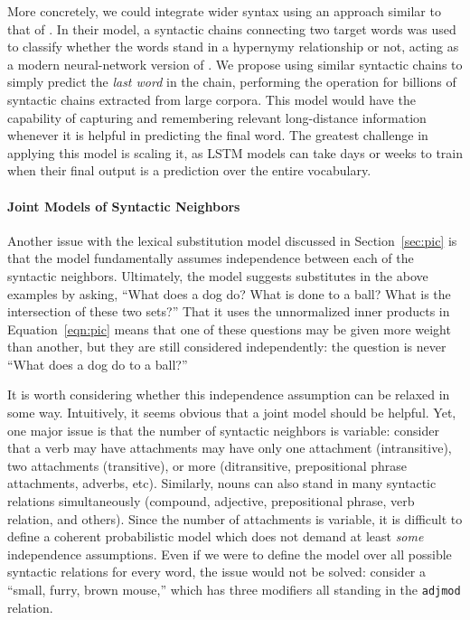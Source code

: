 \documentclass[12pt]{article}
\begin{document}
More concretely, we could integrate wider syntax using an approach similar to
that of . In their model, a syntactic chains
connecting two target words was used to classify whether the words stand in a
hypernymy relationship or not, acting as a modern neural-network version of
. We propose using similar syntactic chains to simply
predict the {\em last word} in the chain, performing the operation for billions
of syntactic chains extracted from large corpora. This model would have the
capability of capturing and remembering relevant long-distance information
whenever it is helpful in predicting the final word. The greatest challenge
in applying this model is scaling it, as LSTM models can take days or weeks
to train when their final output is a prediction over the entire vocabulary.

\paragraph{Joint Models of Syntactic Neighbors}

Another issue with the lexical substitution model discussed in Section~\ref{sec:pic}
is that the model fundamentally assumes independence between each of the syntactic
neighbors. Ultimately, the model suggests substitutes in the above examples by
asking, ``What does a dog do? What is done to a ball? What is the intersection
of these two sets?'' That it uses the unnormalized inner products in Equation~\ref{eqn:pic}
means that one of these questions may be given more weight than another, but they
are still considered independently: the question is never ``What does a dog do
to a ball?''

It is worth considering whether this independence assumption can be relaxed
in some way. Intuitively, it seems obvious that a joint model should be helpful.
Yet, one major issue is that the number of syntactic neighbors is variable:
consider that a verb may have attachments may have only one attachment (intransitive),
two attachments (transitive), or more (ditransitive, prepositional phrase attachments,
adverbs, etc). Similarly, nouns can also stand in many syntactic relations
simultaneously (compound, adjective, prepositional phrase, verb relation, and
others). Since the number of attachments is variable, it is difficult to define
a coherent probabilistic model which does not demand at least {\em some}
independence assumptions. Even if we were to define the model over all possible
syntactic relations for every word, the issue would not be solved: consider
a ``small, furry, brown mouse,'' which has three modifiers all standing
in the {\tt adjmod} relation.
\end{document}
